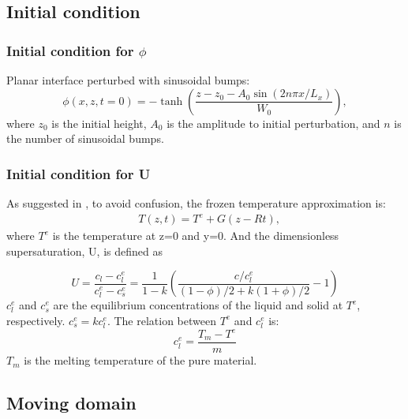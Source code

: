 \documentclass[a4paper,12pt]{article}
\begin{document}
\subsection{Initial condition}
\subsubsection{Initial condition for $\phi$}
Planar interface perturbed with sinusoidal bumps:
\begin{equation}
\phi(x,z,t=0) = - \tanh \left( \frac{z - z_0 - A_0\sin(2n\pi x /L_x  ) }{W_0}  \right),
\end{equation}
where $z_0$ is the initial height, $A_0$ is the amplitude to initial perturbation, and $n$ is the number of  sinusoidal bumps.  
\subsubsection{Initial condition for U}
As suggested in \cite{Takaki2014}, to avoid confusion, the frozen temperature approximation is:
\begin{align}
    & T(z,t) = T^e + G(z-Rt),
\end{align}
where $T^e$ is the temperature at z=0 and y=0.
And the dimensionless supersaturation, U, is defined as

\begin{equation}
U=\frac{c_{l}-c_{l}^{e}}{c_{l}^{e}-c_{s}^{e}}=\frac{1}{1-k} \left( \frac{ c/c_l^e}{(1-\phi)/2 + k(1+\phi)/2} -1\right)
\end{equation}
$c_l^e$ and $c_s^e$ are the equilibrium concentrations of the liquid and solid at $T^e$, respectively. $c_s^e=kc_l^e$.
The relation between $T^e$ and $c_l^e$ is:
\begin{equation}
c_l^e = \frac{T_m-T^{e}}{m}
\end{equation}
$T_m$ is the melting temperature of the pure material.

\subsection{Moving domain}
\end{document}
